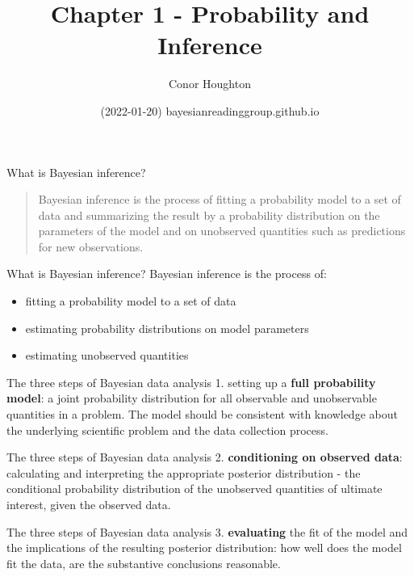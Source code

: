 \documentclass{beamer}
\title[Chapter 1]{Chapter 1 - Probability and Inference}
\author{Conor Houghton}
\institute{reading Gelman}
\date{(2022-01-20) bayesianreadinggroup.github.io}
\begin{document}
\maketitle

\begin{frame}{What is Bayesian inference?}
  \begin{quote}
    Bayesian inference is the process of fitting a probability model
    to a set of data and summarizing the result by a probability
    distribution on the parameters of the model and on unobserved
    quantities such as predictions for new observations.
  \end{quote}
\end{frame}

\begin{frame}{What is Bayesian inference?}
  Bayesian inference is the process of:
\begin{itemize}
\item fitting a probability model to a set of data
\item estimating probability distributions on model parameters
\item estimating unobserved quantities 
\end{itemize}
\end{frame}

\begin{frame}{The three steps of Bayesian data analysis}
1. setting up a \textbf{full probability model}: a joint probability
distribution for all observable and unobservable quantities in a
problem. The model should be consistent with knowledge about the
underlying scientific problem and the data collection process.
\end{frame}

\begin{frame}{The three steps of Bayesian data analysis}
2. \textbf{conditioning on observed data}: calculating and
interpreting the appropriate posterior distribution - the conditional
probability distribution of the unobserved quantities of ultimate
interest, given the observed data.
\end{frame}

\begin{frame}{The three steps of Bayesian data analysis}
  3. \textbf{evaluating} the fit of the model and the implications of the resulting posterior distribution: how well does the model fit the data, are the substantive conclusions reasonable.
\end{frame}
\end{document}
